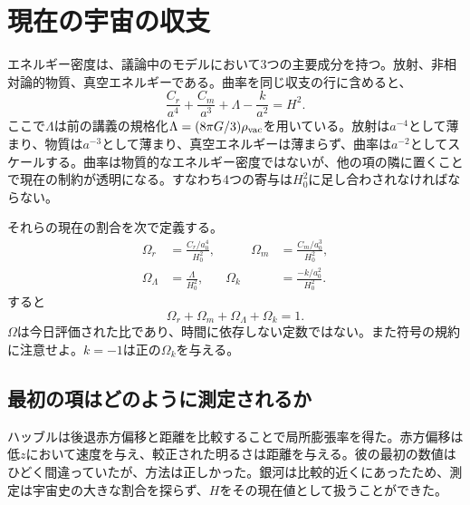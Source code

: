 \section{現在の宇宙の収支}

エネルギー密度は、議論中のモデルにおいて3つの主要成分を持つ。放射、非相対論的物質、真空エネルギーである。曲率を同じ収支の行に含めると、
\begin{equation}
\frac{C_r}{a^4}
+\frac{C_m}{a^3}
+\Lambda
-\frac{k}{a^2}
=H^2.
\label{eq:c06-budget}
\end{equation}
ここで\(\Lambda\)は前の講義の規格化\(\Lambda=(8\pi G/3)\rho_{\rm vac}\)を用いている。放射は\(a^{-4}\)として薄まり、物質は\(a^{-3}\)として薄まり、真空エネルギーは薄まらず、曲率は\(a^{-2}\)としてスケールする。曲率は物質的なエネルギー密度ではないが、他の項の隣に置くことで現在の制約が透明になる。すなわち4つの寄与は\(H_0^2\)に足し合わされなければならない。

それらの現在の割合を次で定義する。
\begin{equation}
\begin{aligned}
\Omega_r&=\frac{C_r/a_0^4}{H_0^2},
&\qquad
\Omega_m&=\frac{C_m/a_0^3}{H_0^2},\\
\Omega_\Lambda&=\frac{\Lambda}{H_0^2},
&
\Omega_k&=\frac{-k/a_0^2}{H_0^2}.
\end{aligned}
\label{eq:c06-omegas}
\end{equation}
すると
\begin{equation}
\boxed{\Omega_r+\Omega_m+\Omega_\Lambda+\Omega_k=1.}
\label{eq:c06-sum-rule}
\end{equation}
\(\Omega\)は今日評価された比であり、時間に依存しない定数ではない。また符号の規約に注意せよ。\(k=-1\)は正の\(\Omega_k\)を与える。

\subsection{最初の項はどのように測定されるか}

ハッブルは後退赤方偏移と距離を比較することで局所膨張率を得た。赤方偏移は低\(z\)において速度を与え、較正された明るさは距離を与える。彼の最初の数値はひどく間違っていたが、方法は正しかった。銀河は比較的近くにあったため、測定は宇宙史の大きな割合を探らず、\(H\)をその現在値として扱うことができた。

\begin{classroomqa}
\end{classroomqa}

